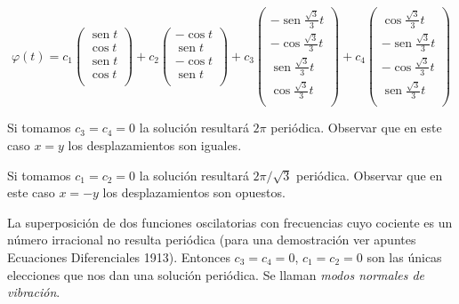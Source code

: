 \begin{ejemplo}{}
$$
\varphi(t)=c_1\begin{pmatrix}
        \operatorname{sen} t\\
        \cos  t \\
        \operatorname{sen} t\\
        \cos  t\\
   \end{pmatrix}
   +
c_2\begin{pmatrix}
        -\cos  t \\
        \operatorname{sen} t\\
         -\cos  t\\
         \operatorname{sen} t\\
     \end{pmatrix}+
c_3\begin{pmatrix}
        -\operatorname{sen}\frac{\sqrt{3}}{3}t\\
        -\cos \frac{\sqrt{3}}{3} t \\
        \operatorname{sen}\frac{\sqrt{3}}{3} t\\
        \cos \frac{\sqrt{3}}{3} t\\
   \end{pmatrix}
   +
c_4\begin{pmatrix}
        \cos \frac{\sqrt{3}}{3} t \\
        -\operatorname{sen}\frac{\sqrt{3}}{3} t\\
         -\cos \frac{\sqrt{3}}{3} t\\
         \operatorname{sen}\frac{\sqrt{3}}{3} t\\
     \end{pmatrix}
$$
 

Si tomamos $c_3=c_4=0$ la solución  resultará $2\pi$ periódica. 
Observar que en este caso $x=y$ los desplazamientos son iguales.

Si tomamos $c_1=c_2=0$ la solución  resultará $2\pi/\sqrt{3}$ 
periódica. Observar que en este caso $x=-y$ los desplazamientos
son opuestos.

La superposición de dos funciones oscilatorias con frecuencias cuyo 
cociente es un número irracional no resulta periódica (para una 
demostración ver apuntes Ecuaciones Diferenciales 1913). Entonces
$c_3=c_4=0$, $c_1=c_2=0$ son las únicas elecciones que nos dan una 
solución periódica. Se llaman \emph{modos normales de vibración}. 
 
\end{ejemplo}

